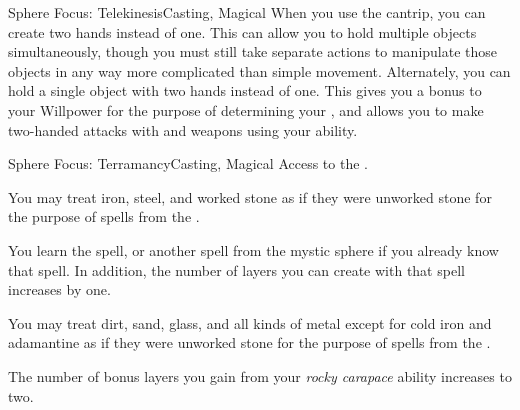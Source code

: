 \begin{magicalfeat}{Sphere Focus: Telekinesis}{Casting, Magical}
         When you use the  cantrip, you can create two hands instead of one.
        This can allow you to hold multiple objects simultaneously, though you must still take separate actions to manipulate those objects in any way more complicated than simple movement.
        Alternately, you can hold a single object with two hands instead of one.
        This gives you a  bonus to your Willpower for the purpose of determining your , and allows you to make two-handed attacks with  and  weapons using your  ability.
    \end{magicalfeat}

    \begin{magicalfeat}{Sphere Focus: Terramancy}{Casting, Magical}
        \featpre Access to the  .

         You may treat iron, steel, and worked stone as if they were unworked stone for the purpose of spells from the  .

         You learn the  spell, or another spell from the  mystic sphere if you already know that spell.
        In addition, the number of layers you can create with that spell increases by one.

         You may treat dirt, sand, glass, and all kinds of metal except for cold iron and adamantine as if they were unworked stone for the purpose of spells from the  .

         The number of bonus layers you gain from your \textit{rocky carapace} ability increases to two.
    \end{magicalfeat}

